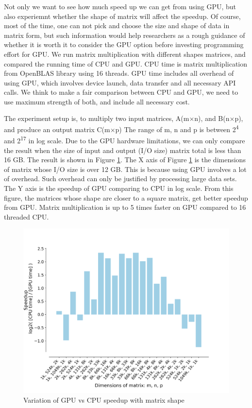 \documentclass[9pt,twocolumn,twoside,lineno]{gsag3jnl}
\begin{document}
Not only we want to see how much speed up we can get from using GPU, but also experiemnt whether the shape of matrix will affect the speedup. 
Of course, most of the time, one can not pick and choose the size and shape of data in matrix form, 
but such information would help researchers as a rough guidance of whether it is worth it to consider the GPU option before investing programming effort for GPU. 
We run matrix multiplication with different shapes matrices, and compared the running time of CPU and GPU. 
CPU time is matrix multiplication from OpenBLAS library using 16 threads. 
GPU time includes all overhead of using GPU, which involves device launch, data transfer and all necessary API calls.
We think to make a fair comparison between CPU and GPU, we need to use maximum strength of both, and include all necessary cost. 

The experiment setup is, to multiply two input matrices, A(m$\times$n), and B(n$\times$p), and produce an output matrix C(m$\times$p)
The range of m, n and p is between 2\textsuperscript{4} and 2\textsuperscript{17} in log scale.
Due to the GPU hardware limitations, we can only compare the result when the size of input and output (I/O size) matrix total is less than 16 GB. 
The result is shown in Figure \ref{GPUCPUShape}. 
The X axis of Figure \ref{GPUCPUShape} is the dimensions of matrix whose I/O size is over 12 GB.
This is because using GPU involves a lot of overhead. 
Such overhead can only be justified by processing large data sets. 
The Y axis is the speedup of GPU comparing to CPU in log scale.  
From this figure, the matrices whose shape are closer to a square matrix, get better speedup from GPU.
Matrix multiplication is up to 5 times faster on GPU compared to 16 threaded CPU. 


\begin{figure}[!htb]
	\centering
	\caption{Variation of GPU vs CPU speedup with matrix shape
	}
	\label{GPUCPUShape}
	\includegraphics[scale = 0.35]{figs/speedup.png}
\end{figure} 
\end{document}
